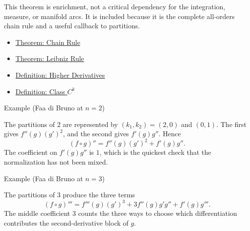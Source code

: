 \begin{remark*}[Scope]
This theorem is enrichment, not a critical dependency for the integration,
measure, or manifold arcs. It is included because it is the complete
all-orders chain rule and a useful callback to partitions.
\end{remark*}

\begin{dependencies}
\begin{itemize}
  \item \hyperref[thm:chain-rule]{Theorem: Chain Rule}
  \item \hyperref[thm:leibniz-rule]{Theorem: Leibniz Rule}
  \item \hyperref[def:higher-derivatives]{Definition: Higher Derivatives}
  \item \hyperref[def:class-ck]{Definition: Class \(C^k\)}
\end{itemize}
\end{dependencies}

\begin{definitionbox}{Example (Faa di Bruno at \(n=2\))}
\label{ex:faa-di-bruno-n2}
\begin{remark*}
The partitions of \(2\) are represented by \((k_1,k_2)=(2,0)\) and
\((0,1)\). The first gives \(f''(g)(g')^2\), and the second gives
\(f'(g)g''\). Hence
\[
  (f\circ g)''
  =
  f''(g)(g')^2+f'(g)g''.
\]
The coefficient on \(f'(g)g''\) is \(1\), which is the quickest check that
the normalization has not been mixed.
\end{remark*}
\end{definitionbox}

\begin{definitionbox}{Example (Faa di Bruno at \(n=3\))}
\label{ex:faa-di-bruno-n3}
\begin{remark*}
The partitions of \(3\) produce the three terms
\[
  (f\circ g)'''
  =
  f'''(g)(g')^3
  +3f''(g)g'g''
  +f'(g)g'''.
\]
The middle coefficient \(3\) counts the three ways to choose which
differentiation contributes the second-derivative block of \(g\).
\end{remark*}
\end{definitionbox}
